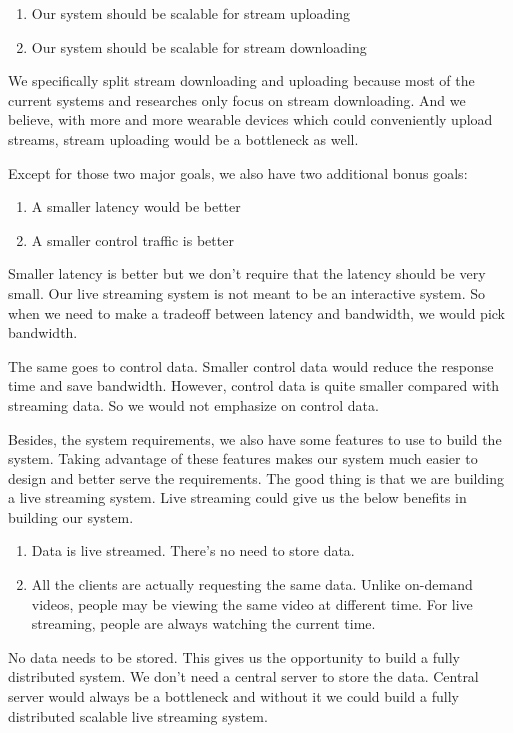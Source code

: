 \documentclass[letterpaper,twocolumn,10pt]{article}
\begin{document}
\begin{enumerate}
  \item Our system should be scalable for stream uploading
  \item Our system should be scalable for stream downloading
\end{enumerate}

We specifically split stream downloading and uploading because most of the current systems and researches only focus on stream downloading. And we believe, with more and more wearable devices which could conveniently upload streams, stream uploading would be a bottleneck as well.

Except for those two major goals, we also have two additional bonus goals:
\begin{enumerate}
  \item A smaller latency would be better
  \item A smaller control traffic is better
\end{enumerate}

Smaller latency is better but we don’t require that the latency should be very small. Our live streaming system is not meant to be an interactive system. So when we need to make a tradeoff between latency and bandwidth, we would pick bandwidth. 

The same goes to control data. Smaller control data would reduce the response time and save bandwidth. However, control data is quite smaller compared with streaming data. So we would not emphasize on control data. 

Besides, the system requirements, we also have some features to use to build the system. Taking advantage of these features makes our system much easier to design and better serve the requirements. The good thing is that we are building a live streaming system. Live streaming could give us the below benefits in building our system.

\begin{enumerate}
  \item Data is live streamed. There’s no need to store data.
  \item All the clients are actually requesting the same data. Unlike on-demand videos, people may be viewing the same video at different time. For live streaming, people are always watching the current time.
\end{enumerate}

No data needs to be stored. This gives us the opportunity to build a fully distributed system. We don’t need a central server to store the data. Central server would always be a bottleneck and without it we could build a fully distributed scalable live streaming system.
\end{document}
